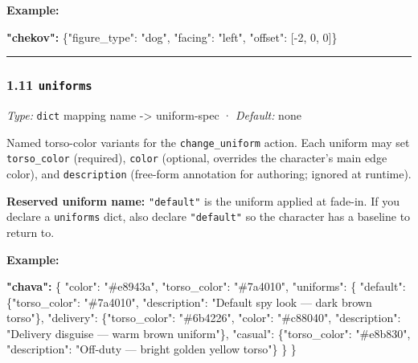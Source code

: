 \documentclass[
  11pt,
]{book}
\newenvironment{Shaded}{}{}
\newcommand{\DataTypeTok}[1]{\textcolor[rgb]{0.56,0.13,0.00}{#1}}
\newcommand{\DecValTok}[1]{\textcolor[rgb]{0.25,0.63,0.44}{#1}}
\newcommand{\ErrorTok}[1]{\textcolor[rgb]{1.00,0.00,0.00}{\textbf{#1}}}
\newcommand{\FunctionTok}[1]{\textcolor[rgb]{0.02,0.16,0.49}{#1}}
\newcommand{\OtherTok}[1]{\textcolor[rgb]{0.00,0.44,0.13}{#1}}
\newcommand{\StringTok}[1]{\textcolor[rgb]{0.25,0.44,0.63}{#1}}
\begin{document}
\textbf{Example:}

\begin{Shaded}
\begin{Highlighting}[]
\ErrorTok{"chekov":} \FunctionTok{\{}\DataTypeTok{"figure\_type"}\FunctionTok{:} \StringTok{"dog"}\FunctionTok{,} \DataTypeTok{"facing"}\FunctionTok{:} \StringTok{"left"}\FunctionTok{,}
           \DataTypeTok{"offset"}\FunctionTok{:} \OtherTok{[}\DecValTok{{-}2}\OtherTok{,} \DecValTok{0}\OtherTok{,} \DecValTok{0}\OtherTok{]}\FunctionTok{\}}
\end{Highlighting}
\end{Shaded}

\begin{center}\rule{0.5\linewidth}{0.5pt}\end{center}

\subsubsection{\texorpdfstring{1.11
\texttt{uniforms}}{1.11 uniforms}}\label{uniforms}

\emph{Type:} \texttt{dict} mapping name -\textgreater{} uniform-spec ·
\emph{Default:} none

Named torso-color variants for the \texttt{change\_uniform} action. Each
uniform may set \texttt{torso\_color} (required), \texttt{color}
(optional, overrides the character's main edge color), and
\texttt{description} (free-form annotation for authoring; ignored at
runtime).

\textbf{Reserved uniform name:} \texttt{"default"} is the uniform
applied at fade-in. If you declare a \texttt{uniforms} dict, also
declare \texttt{"default"} so the character has a baseline to return to.

\textbf{Example:}

\begin{Shaded}
\begin{Highlighting}[]
\ErrorTok{"chava":} \FunctionTok{\{}
  \DataTypeTok{"color"}\FunctionTok{:} \StringTok{"\#e8943a"}\FunctionTok{,}
  \DataTypeTok{"torso\_color"}\FunctionTok{:} \StringTok{"\#7a4010"}\FunctionTok{,}
  \DataTypeTok{"uniforms"}\FunctionTok{:} \FunctionTok{\{}
    \DataTypeTok{"default"}\FunctionTok{:}  \FunctionTok{\{}\DataTypeTok{"torso\_color"}\FunctionTok{:} \StringTok{"\#7a4010"}\FunctionTok{,}
                 \DataTypeTok{"description"}\FunctionTok{:} \StringTok{"Default spy look — dark brown torso"}\FunctionTok{\},}
    \DataTypeTok{"delivery"}\FunctionTok{:} \FunctionTok{\{}\DataTypeTok{"torso\_color"}\FunctionTok{:} \StringTok{"\#6b4226"}\FunctionTok{,} \DataTypeTok{"color"}\FunctionTok{:} \StringTok{"\#c88040"}\FunctionTok{,}
                 \DataTypeTok{"description"}\FunctionTok{:} \StringTok{"Delivery disguise — warm brown uniform"}\FunctionTok{\},}
    \DataTypeTok{"casual"}\FunctionTok{:}   \FunctionTok{\{}\DataTypeTok{"torso\_color"}\FunctionTok{:} \StringTok{"\#e8b830"}\FunctionTok{,}
                 \DataTypeTok{"description"}\FunctionTok{:} \StringTok{"Off{-}duty — bright golden yellow torso"}\FunctionTok{\}}
  \FunctionTok{\}}
\FunctionTok{\}}
\end{Highlighting}
\end{Shaded}
\end{document}
